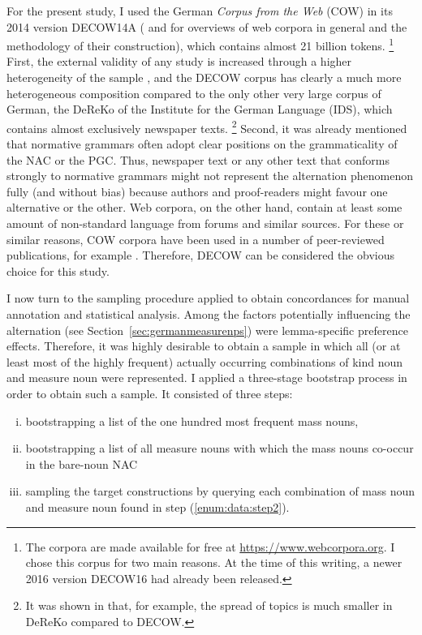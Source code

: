 \documentclass[USenglish]{article}
\begin{document}
For the present study, I used the German \textit{Corpus from the Web} (COW) in its 2014 version DECOW14A (\citealp{SchaeferBildhauer2012full,Schaefer2015b} and \citealp{BiemannEa2013,SchaeferBildhauer2013} for overviews of web corpora in general and the methodology of their construction), which contains almost 21 billion tokens.%
\footnote{The corpora are made available for free at \url{https://www.webcorpora.org}.
I chose this corpus for two main reasons.
At the time of this writing, a newer 2016 version DECOW16 had already been released.}
First, the external validity of any study is increased through a higher heterogeneity of the sample \citep[30]{MaxwellDelaney2004}, and the DECOW corpus has clearly a much more heterogeneous composition compared to the only other very large corpus of German, the DeReKo \citep{KupietzEa2010} of the Institute for the German Language (IDS), which contains almost exclusively newspaper texts.%
\footnote{It was shown in \cite{W16-2601} that, for example, the spread of topics is much smaller in DeReKo compared to DECOW.}
Second, it was already mentioned that normative grammars often adopt clear positions on the grammaticality of the NAC or the PGC.
Thus, newspaper text or any other text that conforms strongly to normative grammars might not represent the alternation phenomenon fully (and without bias) because authors and proof-readers might favour one alternative or the other.
Web corpora, on the other hand, contain at least some amount of non-standard language from forums and similar sources.
For these or similar reasons, COW corpora have been used in a number of peer-reviewed publications, for example \cite{VanGoethemHiligsmann2014,VanGoethemHuening2015,MuellerS2014,Schaefer2016c,SchaeferSayatz2014,SchaeferSayatz2016,Zimmer2015}. 
Therefore, DECOW can be considered the obvious choice for this study.

I now turn to the sampling procedure applied to obtain concordances for manual annotation and statistical analysis.
Among the factors potentially influencing the alternation (see Section~\ref{sec:germanmeasurenps}) were lemma-specific preference effects.
Therefore, it was highly desirable to obtain a sample in which all (or at least most of the highly frequent) actually occurring combinations of kind noun and measure noun were represented.
I applied a three-stage bootstrap process in order to obtain such a sample.
It consisted of three steps:

\begin{enumerate}[i.]
  \item\label{enum:data:step1} bootstrapping a list of the one hundred most frequent mass nouns,
  \item\label{enum:data:step2} bootstrapping a list of all measure nouns with which the mass nouns co-occur in the bare-noun NAC 
  \item\label{enum:data:step3} sampling the target constructions by querying each combination of mass noun and measure noun found in step (\ref{enum:data:step2}).
\end{enumerate}
\end{document}
